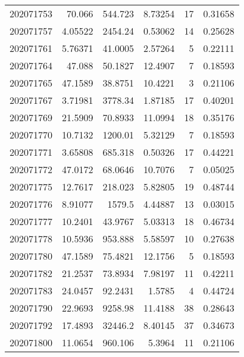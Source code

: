 \begin{tabular}{rrrrrr}
 202071753 &         70.066   &      544.723  &            8.73254 &          17 & 0.31658 \\
 202071757 &          4.05522 &     2454.24   &            0.53062 &          14 & 0.25628 \\
 202071761 &          5.76371 &       41.0005 &            2.57264 &           5 & 0.22111 \\
 202071764 &         47.088   &       50.1827 &           12.4907  &           7 & 0.18593 \\
 202071765 &         47.1589  &       38.8751 &           10.4221  &           3 & 0.21106 \\
 202071767 &          3.71981 &     3778.34   &            1.87185 &          17 & 0.40201 \\
 202071769 &         21.5909  &       70.8933 &           11.0994  &          18 & 0.35176 \\
 202071770 &         10.7132  &     1200.01   &            5.32129 &           7 & 0.18593 \\
 202071771 &          3.65808 &      685.318  &            0.50326 &          17 & 0.44221 \\
 202071772 &         47.0172  &       68.0646 &           10.7076  &           7 & 0.05025 \\
 202071775 &         12.7617  &      218.023  &            5.82805 &          19 & 0.48744 \\
 202071776 &          8.91077 &     1579.5    &            4.44887 &          13 & 0.03015 \\
 202071777 &         10.2401  &       43.9767 &            5.03313 &          18 & 0.46734 \\
 202071778 &         10.5936  &      953.888  &            5.58597 &          10 & 0.27638 \\
 202071780 &         47.1589  &       75.4821 &           12.1756  &           5 & 0.18593 \\
 202071782 &         21.2537  &       73.8934 &            7.98197 &          11 & 0.42211 \\
 202071783 &         24.0457  &       92.2431 &            1.5785  &           4 & 0.44724 \\
 202071790 &         22.9693  &     9258.98   &           11.4188  &          38 & 0.28643 \\
 202071792 &         17.4893  &    32446.2    &            8.40145 &          37 & 0.34673 \\
 202071800 &         11.0654  &      960.106  &            5.3964  &          11 & 0.21106 \\

\end{tabular}
